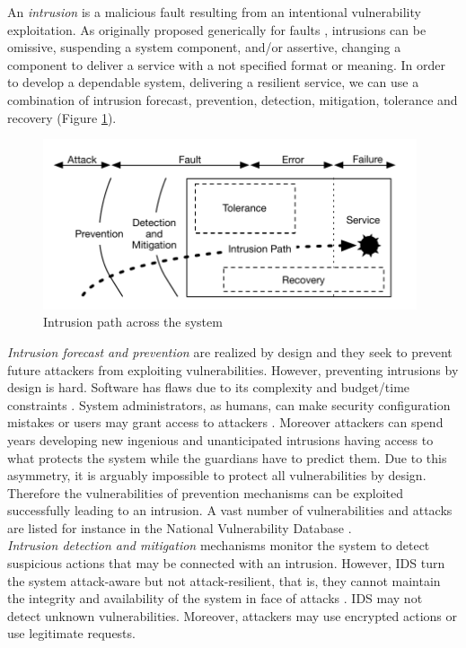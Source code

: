 An \emph{intrusion} is a malicious fault resulting from an intentional vulnerability exploitation. As originally proposed generically for faults \cite{Aviz,Powell1992}, intrusions can be omissive, suspending a system component, and/or assertive, changing a component to deliver a service with a not specified format or meaning. In order to develop a dependable system, delivering a resilient service, we can use a combination of intrusion forecast, prevention, detection, mitigation, tolerance and recovery (Figure \ref{fig:intrusion_path}). \\

\begin{figure}
\centering
\includegraphics[width=110mm]{images/intrusion}
\caption{Intrusion path across the system}
\label{fig:intrusion_path}
\end{figure}

\emph{Intrusion forecast and prevention} are realized by design and they seek to prevent future attackers from exploiting vulnerabilities. However, preventing intrusions by design is hard. Software has flaws due to its complexity and budget/time constraints \cite{Charette2005,Landwehr1992}. System administrators, as humans, can make security configuration mistakes or users may grant access to attackers \cite{Brown2001}. Moreover attackers can spend years developing new ingenious and unanticipated intrusions having access to what protects the system while the guardians have to predict them. Due to this asymmetry, it is arguably impossible to protect all vulnerabilities by design. Therefore the vulnerabilities of prevention mechanisms can be exploited successfully leading to an intrusion. A vast number of vulnerabilities and attacks are listed for instance in the National Vulnerability Database \cite{nistNVD}.\\

\emph{Intrusion detection and mitigation} mechanisms monitor the system to detect suspicious actions that may be connected with an intrusion. However, \acf{IDS} turn the system attack-aware but not attack-resilient, that is, they cannot maintain the integrity and availability of the system in face of attacks \cite{Ammann2002}. \acf{IDS} may not detect unknown vulnerabilities. Moreover, attackers may use encrypted actions or use legitimate requests.\\

